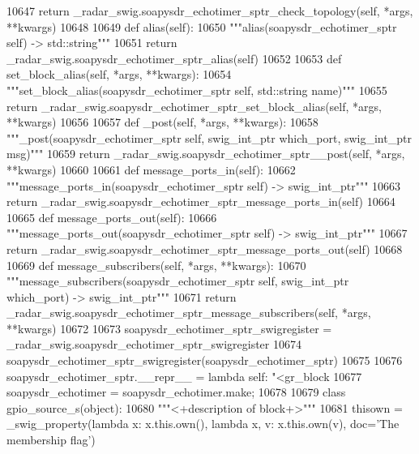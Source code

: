\begin{DoxyCode}
{{{{{{{{{{{{{{{{{{{{{{{{{{{{{{{{{10647         \textcolor{keywordflow}{return} \_radar\_swig.soapysdr\_echotimer\_sptr\_check\_topology(self, *args, **kwargs)
10648 
10649     \textcolor{keyword}{def }alias(self):
10650         \textcolor{stringliteral}{"""alias(soapysdr\_echotimer\_sptr self) -> std::string"""}
10651         \textcolor{keywordflow}{return} \_radar\_swig.soapysdr\_echotimer\_sptr\_alias(self)
10652 
10653     \textcolor{keyword}{def }set_block_alias(self, *args, **kwargs):
10654         \textcolor{stringliteral}{"""set\_block\_alias(soapysdr\_echotimer\_sptr self, std::string name)"""}
10655         \textcolor{keywordflow}{return} \_radar\_swig.soapysdr\_echotimer\_sptr\_set\_block\_alias(self, *args, **kwargs)
10656 
10657     \textcolor{keyword}{def }_post(self, *args, **kwargs):
10658         \textcolor{stringliteral}{"""\_post(soapysdr\_echotimer\_sptr self, swig\_int\_ptr which\_port, swig\_int\_ptr msg)"""}
10659         \textcolor{keywordflow}{return} \_radar\_swig.soapysdr\_echotimer\_sptr\_\_post(self, *args, **kwargs)
10660 
10661     \textcolor{keyword}{def }message_ports_in(self):
10662         \textcolor{stringliteral}{"""message\_ports\_in(soapysdr\_echotimer\_sptr self) -> swig\_int\_ptr"""}
10663         \textcolor{keywordflow}{return} \_radar\_swig.soapysdr\_echotimer\_sptr\_message\_ports\_in(self)
10664 
10665     \textcolor{keyword}{def }message_ports_out(self):
10666         \textcolor{stringliteral}{"""message\_ports\_out(soapysdr\_echotimer\_sptr self) -> swig\_int\_ptr"""}
10667         \textcolor{keywordflow}{return} \_radar\_swig.soapysdr\_echotimer\_sptr\_message\_ports\_out(self)
10668 
10669     \textcolor{keyword}{def }message_subscribers(self, *args, **kwargs):
10670         \textcolor{stringliteral}{"""message\_subscribers(soapysdr\_echotimer\_sptr self, swig\_int\_ptr which\_port) -> swig\_int\_ptr"""}
10671         \textcolor{keywordflow}{return} \_radar\_swig.soapysdr\_echotimer\_sptr\_message\_subscribers(self, *args, **kwargs)
10672 
10673 soapysdr\_echotimer\_sptr\_swigregister = \_radar\_swig.soapysdr\_echotimer\_sptr\_swigregister
10674 soapysdr_echotimer_sptr_swigregister(soapysdr\_echotimer\_sptr)
10675 
10676 soapysdr\_echotimer\_sptr.\_\_repr\_\_ = \textcolor{keyword}{lambda} self: \textcolor{stringliteral}{"<gr\_block %
10677 soapysdr\_echotimer = soapysdr\_echotimer.make;
10678 
10679 \textcolor{keyword}{class }gpio_source_s(object):
10680     \textcolor{stringliteral}{"""<+description of block+>"""}
10681     thisown = _swig_property(\textcolor{keyword}{lambda} x: x.this.own(), \textcolor{keyword}{lambda} x, v: x.this.own(v), doc=\textcolor{stringliteral}{'The membership flag'})
}}}}}}}}}}}}}}}}}}}}}}}}}}}}}}}}}}
\end{DoxyCode}
